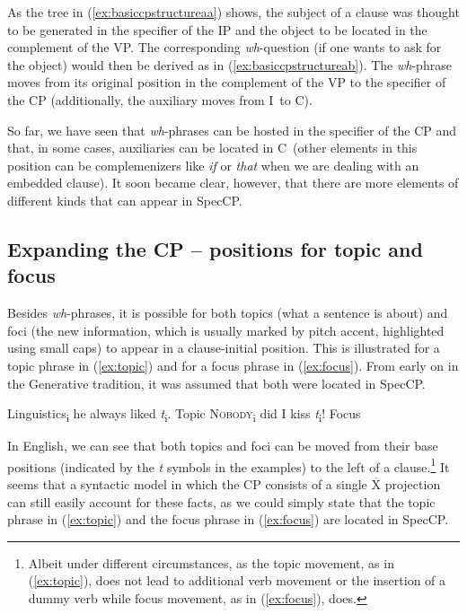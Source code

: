 \noindent As the tree in (\ref{ex:basiccpstructureaa}) shows, the subject of a clause was thought to be generated in the specifier of the IP and the object to be located in the complement of the VP. The corresponding \textit{wh}-question (if one wants to ask for the object) would then be derived as in (\ref{ex:basiccpstructureab}). The \textit{wh}-phrase moves from its original position in the complement of the VP to the specifier of the CP (additionally, the auxiliary moves from I\textdegree\ to C\textdegree ). 

So far, we have seen that \textit{wh}-phrases can be hosted in the specifier of the CP and that, in some cases, auxiliaries can be located in C\textdegree\ (other elements in this position can be complemenizers like \textit{if} or \textit{that} when we are dealing with an embedded clause). It soon became clear, however, that there are more elements of different kinds that can appear in SpecCP. 

\subsection{Expanding the CP -- positions for topic and focus}\label{expanding}
Besides \textit{wh}-phrases, it is possible for both topics (what a sentence is about) and foci (the new information, which is usually marked by pitch accent, highlighted using small caps) to appear in a clause-initial position. This is illustrated for a topic phrase in (\ref{ex:topic}) and for a focus phrase in (\ref{ex:focus}). From early on in the Generative tradition, it was assumed that both were located in SpecCP.

\begin{exe}
\ex\begin{xlist} 
\ex Linguistics\textsubscript{i} he always liked \textit{t}\textsubscript{i}. \hfill Topic \label{ex:topic}
\ex \textsc{Nobody}\textsubscript{i} did I kiss \textit{t}\textsubscript{i}! \hfill Focus \label{ex:focus}
\end{xlist}
\end{exe}

\noindent In English, we can see that both topics and foci can be moved from their base positions (indicated by the \textit{t} symbols in the examples) to the left of a clause.\footnote{ Albeit under different circumstances, as the topic movement, as in (\ref{ex:topic}), does not lead to additional verb movement or the insertion of a dummy verb while focus movement, as in (\ref{ex:focus}), does.} It seems that a syntactic model in which the CP consists of a single $\overline{\textrm{X}}$ projection can still easily account for these facts, as we could simply state that the topic phrase in (\ref{ex:topic}) and the focus phrase in (\ref{ex:focus}) are located in SpecCP. 

